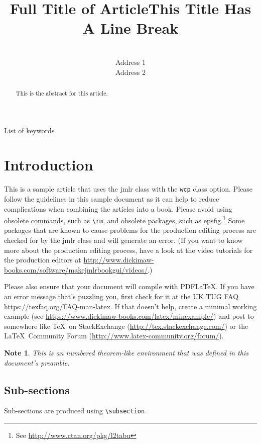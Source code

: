 \documentclass[pmlr,twocolumn]{jmlr} %
\title[Short Title]{Full Title of Article\titlebreak This Title Has
A Line Break}
\author{%
\Name{Author Name1} \Email{abc@sample.com}\\
\addr Address 1
\AND
\Name{Author Name2} \Email{xyz@sample.com}\\
\addr Address 2
}
\newtheorem*{note}{Note}
\begin{document}
\maketitle

\begin{abstract}
This is the abstract for this article.
\end{abstract}
\begin{keywords}
List of keywords
\end{keywords}

\section{Introduction}
\label{sec:intro}

This is a sample article that uses the \textsf{jmlr} class with
the \texttt{wcp} class option.  Please follow the guidelines in
this sample document as it can help to reduce complications when
combining the articles into a book. Please avoid using obsolete
commands, such as \verb|\rm|, and obsolete packages, such as
\textsf{epsfig}.\footnote{See
\url{http://www.ctan.org/pkg/l2tabu}} Some packages that are known
to cause problems for the production editing process are checked for
by the \textsf{jmlr} class and will generate an error. (If you want
to know more about the production editing process, have a look at
the video tutorials for the production editors at
\url{http://www.dickimaw-books.com/software/makejmlrbookgui/videos/}.)

Please also ensure that your document will compile with PDF\LaTeX.
If you have an error message that's puzzling you, first check for it
at the UK TUG FAQ
\url{https://texfaq.org/FAQ-man-latex}.  If
that doesn't help, create a minimal working example (see
\url{https://www.dickimaw-books.com/latex/minexample/}) and post
to somewhere like \TeX\ on StackExchange
(\url{http://tex.stackexchange.com/}) or the \LaTeX\ Community Forum
(\url{http://www.latex-community.org/forum/}).

\begin{note}
This is an numbered theorem-like environment that was defined in
this document's preamble.
\end{note}

\subsection{Sub-sections}

Sub-sections are produced using \verb|\subsection|.
\end{document}
